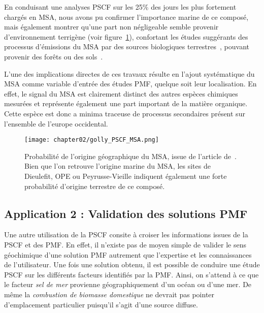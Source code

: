 En conduisant une analyses PSCF sur les 25\% des jours les plus fortement chargés en MSA,
nous avons pu confirmer l'importance marine de ce composé, mais également montrer qu'une
part non négligeable semble provenir d'environnement terrigène (voir
figure~\ref{fig:chapter02/golly_PSCF_MSA}), confortant les études suggérants des
processus d'émissions du MSA par des sources biologiques
terrestres~\autocite{bozzettiArgon2017}, pouvant provenir des forêts ou des
sols~\autocite{jardineDimethyl2015,miyazakiSeasonal2012}.

L'une des implications directes de ces travaux résulte en l'ajout systématique du MSA
comme variable d'entrée des études PMF, quelque soit leur localisation. En effet, le
signal du MSA est clairement distinct des autres espèces chimiques mesurées et représente
également une part important de la matière organique. Cette espèce est donc a minima
traceuse de processus secondaires présent sur l'ensemble de l'europe occidental.

\begin{figure}[ht]
    \centering
    \texttt{[image: chapter02/golly\_PSCF\_MSA.png]}
    \caption{Probabilité de l'origine géographique du MSA, issue de l'article
        de~\textcite{gollyOrganic2019}. Bien que l'on retrouve l'origine marine du MSA,
        les sites de Dieulefit, OPE ou Peyrusse-Vieille indiquent également une forte
        probabilité d'origine terrestre de ce composé.}%
    \label{fig:chapter02/golly_PSCF_MSA}
\end{figure}

\subsection{Application 2 : Validation des solutions PMF}%
\label{sub:application_2_validation_des_solutions_pmf}

Une autre utilisation de la PSCF consite à croiser les informations issues de la PSCF et
des PMF.
En effet, il n'existe pas de moyen simple de valider le sens géochimique d'une solution
PMF autrement que l'expertise et les connaissances de l'utilisateur.
Une fois une solution obtenu, il est possible de conduire une étude PSCF sur les
différents facteurs identifiés par la PMF. Ainsi, on s'attend à ce que le facteur
\textit{sel de mer} provienne géographiquement d'un océan ou d'une mer. De même la
\textit{combustion de biomasse domestique} ne devrait pas pointer d'emplacement
particulier puisqu'il s'agit d'une source diffuse.

